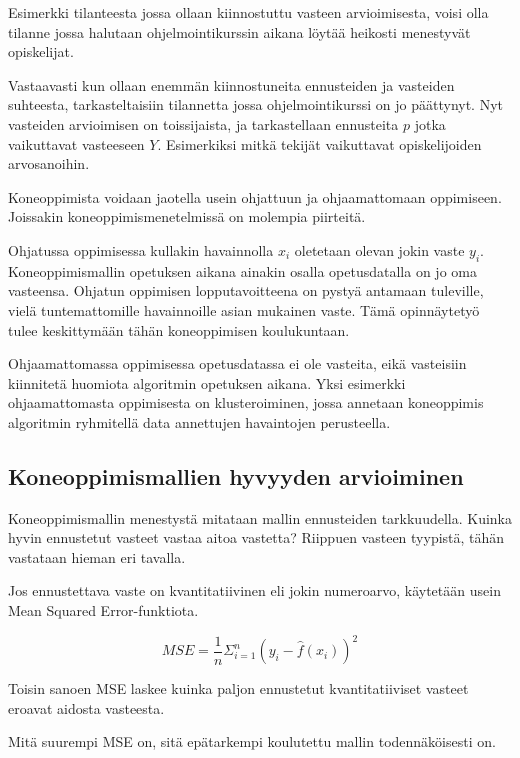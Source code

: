 \documentclass[finnish,twoside,openright]{HYgraduMLDS}
\begin{document}
Esimerkki tilanteesta jossa ollaan kiinnostuttu vasteen arvioimisesta, voisi olla tilanne jossa halutaan ohjelmointikurssin aikana löytää heikosti menestyvät opiskelijat.

Vastaavasti kun ollaan enemmän kiinnostuneita ennusteiden ja vasteiden suhteesta, tarkasteltaisiin tilannetta jossa ohjelmointikurssi on jo päättynyt. Nyt vasteiden arvioimisen on toissijaista, ja tarkastellaan ennusteita $p$ jotka vaikuttavat vasteeseen $Y$. Esimerkiksi mitkä tekijät vaikuttavat opiskelijoiden arvosanoihin.

Koneoppimista voidaan jaotella usein ohjattuun ja ohjaamattomaan oppimiseen. Joissakin koneoppimismenetelmissä on molempia piirteitä.

Ohjatussa oppimisessa kullakin havainnolla $x_i$ oletetaan olevan jokin vaste $y_i$. Koneoppimismallin opetuksen aikana ainakin osalla opetusdatalla on jo oma vasteensa. Ohjatun oppimisen lopputavoitteena on pystyä antamaan tuleville, vielä tuntemattomille havainnoille asian mukainen vaste. Tämä opinnäytetyö tulee keskittymään tähän koneoppimisen koulukuntaan.

Ohjaamattomassa oppimisessa opetusdatassa ei ole vasteita, eikä vasteisiin kiinnitetä huomiota algoritmin opetuksen aikana. Yksi esimerkki ohjaamattomasta oppimisesta on klusteroiminen, jossa annetaan koneoppimis algoritmin ryhmitellä data annettujen havaintojen perusteella.

\subsection{Koneoppimismallien hyvyyden arvioiminen}

Koneoppimismallin menestystä mitataan mallin ennusteiden tarkkuudella. Kuinka hyvin ennustetut vasteet vastaa aitoa vastetta? Riippuen vasteen tyypistä, tähän vastataan hieman eri tavalla.

Jos ennustettava vaste on kvantitatiivinen eli jokin numeroarvo, käytetään usein Mean Squared Error-funktiota\cite{james2013ISLR}.

\begin{equation}
    MSE = \frac{1}{n} \Sigma^n_{i=1} (y_i - \hat{f}(x_i))^2
\end{equation}

Toisin sanoen MSE laskee kuinka paljon ennustetut kvantitatiiviset vasteet eroavat aidosta vasteesta. 

Mitä suurempi MSE on, sitä epätarkempi koulutettu mallin todennäköisesti on.
\end{document}
